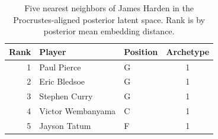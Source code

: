 \begin{table}[htbp]
  \centering\small
  \begin{tabular}{rllc}
    \toprule
    Rank & Player & Position & Archetype \\
    \midrule
    1 & Paul Pierce & G & 1 \\
    2 & Eric Bledsoe & G & 1 \\
    3 & Stephen Curry & G & 1 \\
    4 & Victor Wembanyama & C & 1 \\
    5 & Jayson Tatum & F & 1 \\
    \bottomrule
  \end{tabular}
  \caption{Five nearest neighbors of James Harden in the Procrustes-aligned posterior latent space. Rank is by posterior mean embedding distance.}
  \label{tab:James_Harden_neighbors}
\end{table}

